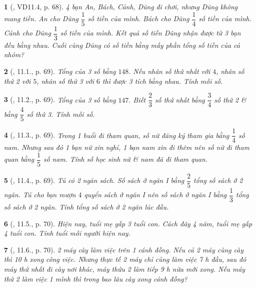 \documentclass{article}
\newtheorem{baitoan}{}
\begin{document}
\begin{baitoan}[\cite{TLCT_THCS_Toan_6_so_hoc}, VD11.4, p. 68]
	4 bạn An, Bách, Cảnh, Dũng đi chơi, nhưng Dũng không mang tiền. An cho Dũng $\dfrac{1}{5}$ số tiền của mình. Bách cho Dũng $\dfrac{1}{4}$ số tiền của mình. Cảnh cho Dũng $\dfrac{1}{3}$ số tiền của mình. Kết quả số tiền Dũng nhận được từ 3 bạn đều bằng nhau. Cuối cùng Dũng có số tiền bằng mấy phần tổng số tiền của cả nhóm?
\end{baitoan}

\begin{baitoan}[\cite{TLCT_THCS_Toan_6_so_hoc}, 11.1., p. 69]
	Tổng của 3 số bằng $148$. Nếu nhân số thứ nhất với $4$, nhân số thứ 2 với $5$, nhân số thứ 3 với $6$ thì được 3 tích bằng nhau. Tính mỗi số.
\end{baitoan}

\begin{baitoan}[\cite{TLCT_THCS_Toan_6_so_hoc}, 11.2., p. 69]
	Tổng của 3 số bằng $147$. Biết $\dfrac{2}{3}$ số thứ nhất bằng $\dfrac{3}{4}$ số thứ 2 \& bằng $\dfrac{4}{5}$ số thứ 3. Tính mỗi số.
\end{baitoan}

\begin{baitoan}[\cite{TLCT_THCS_Toan_6_so_hoc}, 11.3., p. 69]
	Trong 1 buổi đi tham quan, số nữ đăng ký tham gia bằng $\dfrac{1}{4}$ số nam. Nhưng sau đó 1 bạn nữ xin nghỉ, 1 bạn nam xin đi thêm nên số nữ đi tham quan bằng $\dfrac{1}{5}$ số nam. Tính số học sinh nữ \& nam đã đi tham quan.
\end{baitoan}

\begin{baitoan}[\cite{TLCT_THCS_Toan_6_so_hoc}, 11.4., p. 69]
	Tú có 2 ngăn sách. Số sách ở ngăn I bằng $\dfrac{2}{5}$ tổng số sách ở 2 ngăn. Tú cho bạn mượn $4$ quyển sách ở ngăn I nên số sách ở ngăn I bằng $\dfrac{1}{3}$ tổng số sách ở 2 ngăn. Tính tổng số sách ở 2 ngăn lúc đầu.
\end{baitoan}

\begin{baitoan}[\cite{TLCT_THCS_Toan_6_so_hoc}, 11.5., p. 70]
	Hiện nay, tuổi mẹ gấp 3 tuổi con. Cách đây 4 năm, tuổi mẹ gấp 4 tuổi con. Tính tuổi mỗi người hiện nay.
\end{baitoan}

\begin{baitoan}[\cite{TLCT_THCS_Toan_6_so_hoc}, 11.6., p. 70]
	2 máy cày làm việc trên 1 cánh đồng. Nếu cả 2 máy cùng cày thì {\rm10 h} xong công việc. Nhưng thực tế 2 máy chỉ cùng làm việc {\rm7 h} đầu, sau đó máy thứ nhất đi cày nơi khác, máy thứu 2 làm tiếp {\rm9 h} nữa mới xong. Nếu máy thứ 2 làm việc 1 mình thì trong bao lâu cày xong cánh đồng?
\end{baitoan}
\end{document}
